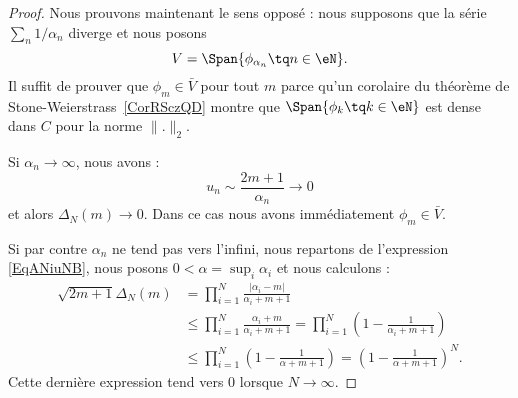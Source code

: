 \begin{proof}
	Nous prouvons maintenant le sens opposé : nous supposons que la série \( \sum_n1/\alpha_n\) diverge et nous posons
	\begin{equation}
		V=\Span\{ \phi_{\alpha_n}\tq n\in \eN \}.
	\end{equation}
	Il suffit de prouver que \( \phi_m\in \bar V\) pour tout \( m\) parce qu'un corolaire du théorème de Stone-Weierstrass~\ref{CorRSczQD} montre que \( \Span\{ \phi_k\tq k\in \eN \}\) est dense dans \( C\) pour la norme \( \| . \|_2\).

	Si \( \alpha_n\to \infty\), nous avons :
	\begin{equation}
		u_n\sim\frac{ 2m+1 }{ \alpha_n }\to 0
	\end{equation}
	et alors \( \Delta_N(m)\to 0\). Dans ce cas nous avons immédiatement \( \phi_m\in \bar V\).

	Si par contre \( \alpha_n\) ne tend pas vers l'infini, nous repartons de l'expression \eqref{EqANiuNB}, nous posons \( 0<\alpha=\sup_i\alpha_i\) et nous calculons :
	\begin{subequations}
		\begin{align}
			\sqrt{2m+1}\Delta_N(m) & =\prod_{i=1}^N\frac{ | \alpha_i-m | }{ \alpha_i+m+1 }     \\
			                       & \leq \prod_{i=1}^N\frac{ \alpha_i+m }{ \alpha_i+m+1 }
			=    \prod_{i=1}^N\left( 1-\frac{ 1 }{ \alpha_i+m+1 } \right)                      \\
			                       & \leq \prod_{i=1}^N\left( 1-\frac{1}{ \alpha+m+1 } \right)
			=    \left( 1-\frac{1}{ \alpha+m+1 } \right)^N.
		\end{align}
	\end{subequations}
	Cette dernière expression tend vers \( 0\) lorsque \( N\to \infty\).
\end{proof}

